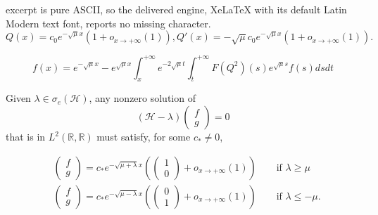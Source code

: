 \documentclass[10pt,a4paper]{amsart}
\begin{document}
excerpt is pure ASCII, so the delivered engine, XeLaTeX with its default Latin Modern text font, reports no missing character.
\begin{equation}
  Q (x) = c_0 e^{-\sqrt{\mu} x} (1 + o_{x \rightarrow
  + \infty} (1)),Q'(x)=-\sqrt{\mu}c_0 e^{-\sqrt{\mu} x} (1+o_{x \rightarrow
  + \infty} (1)). \label{kanine}
\end{equation}

\begin{equation}
  f (x) = e^{- \sqrt{\mu} x} - e^{\sqrt{\mu} x} \int_x^{+ \infty} e^{- 2
  \sqrt{\mu} t} \int_t^{+ \infty} F (Q^2) (s) e^{\sqrt{\mu} s} f (s) d s d t
  \label{avb}
\end{equation}

\begin{lem}
  \label{fiberoptic}Given $\lambda \in  \sigma_e (\mathcal{H})$, any nonzero solution
  of
  \[ (\mathcal{H}- \lambda) \left(\begin{array}{c}
       f\\
       g
     \end{array}\right) = 0 \]
  that is in $L^2 (\mathbb{R}, \mathbb{R})$ must satisfy, for some $c_* \neq 0$,

\begin{align*}
& \left(\begin{array}{c}
       f\\
       g
     \end{array}\right) = c_{\ast} e^{-\sqrt{\mu + \lambda} x} \left( \left(\begin{array}{c}
       1\\
       0
     \end{array}\right) + o_{x \rightarrow + \infty} (1) \right)
      \qquad \mbox{if $\lambda \geq \mu$} \\
& \left(\begin{array}{c}
       f\\
       g
     \end{array}\right) = c_{\ast} e^{-\sqrt{\mu - \lambda} x}
     \left( \left(\begin{array}{c}
       0\\
       1
     \end{array}\right) + o_{x \rightarrow + \infty} (1) \right) \qquad \mbox{if $\lambda \leq - \mu$}.
\end{align*}

\end{lem}
\end{document}
